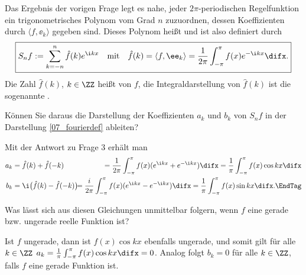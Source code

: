   \begin{antwort}
    Das Ergebnis der vorigen Frage legt es nahe, jeder $2\pi$-periodischen 
    Regelfunktion ein trigonometrisches Polynom vom Grad $n$ zuzuordnen, dessen 
    Koeffizienten durch $\langle f, \ee_k \rangle$ gegeben sind. 
    Dieses Polynom heißt  
    und ist also definiert durch
    \[
    \boxed{
      S_nf := \sum_{k=-n}^n \hat{f}(k)e^{\i kx} \quad\text{mit}\quad
      \hat{f}(k)=\langle f, \ee_k\rangle=
      \frac{1}{2\pi}\int_{-\pi}^{\pi} f(x)e^{-\i kx}\difx.
    }
    \]
    Die Zahl $\hat{f}(k)$, $k\in\ZZ$ heißt 
    von $f$, die Integraldarstellung von $\hat{f}(k)$ ist die sogenannte 
    .
    \AntEnd
  \end{antwort}

  \begin{frage}\label{07_fourierkoeff}
    Können Sie daraus die Darstellung der Koeffizienten $a_k$ und $b_k$ 
    von $S_n f$ in der Darstellung \ref{07_fourierdef} ableiten?
  \end{frage}

  \begin{antwort}
    Mit der Antwort zu Frage 3 erhält man 
    \begin{align*}
      a_k &= 
      \hat{f}(k)+\hat{f}(-k) \hspace*{-4mm} &= \frac{1}{2\pi} \int_{-\pi}^\pi f(x) 
      (e^{\i kx}+e^{-\i kx}) \difx=
      \frac{1}{\pi} \int_{-\pi}^\pi f(x) \cos kx \difx   \notag \\
      b_k &= \i \big( \hat{f}(k)-\hat{f}(-k) \big) \hspace*{-4mm} &= \frac{i}{2\pi}
      \int_{-\pi}^\pi f(x) 
      (e^{\i kx}-e^{-\i kx}) \difx=
      \frac{1}{\pi} \int_{-\pi}^\pi f(x) \sin kx \difx. \EndTag
    \end{align*}
  \end{antwort}

  \begin{frage}
    Was lässt sich aus diesen Gleichungen unmittelbar folgern, 
    wenn $f$ eine gerade bzw. ungerade reelle Funktion ist?
  \end{frage}

  \begin{antwort}
    Ist $f$ ungerade, dann ist $f(x)\cos kx$ ebenfalls ungerade, und 
    somit gilt für alle $k\in\ZZ$ $a_k=\frac{1}{\pi}\int_{-\pi}^\pi f(x)\cos kx \difx=0$. Analog folgt $b_k=0$ für alle $k\in\ZZ$, 
    falls $f$ eine gerade Funktion ist.
    \AntEnd
  \end{antwort}


